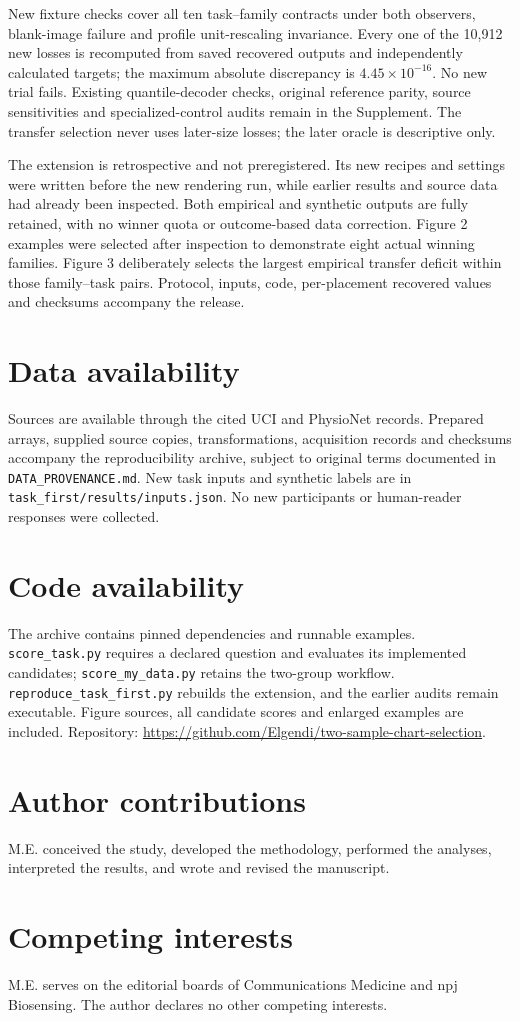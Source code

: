 \documentclass[11pt]{article}
\begin{document}
New fixture checks cover all ten task--family contracts under both observers, blank-image failure and profile unit-rescaling invariance. Every one of the 10,912 new losses is recomputed from saved recovered outputs and independently calculated targets; the maximum absolute discrepancy is $4.45\times10^{-16}$. No new trial fails. Existing quantile-decoder checks, original reference parity, source sensitivities and specialized-control audits remain in the Supplement. The transfer selection never uses later-size losses; the later oracle is descriptive only.

The extension is retrospective and not preregistered. Its new recipes and settings were written before the new rendering run, while earlier results and source data had already been inspected. Both empirical and synthetic outputs are fully retained, with no winner quota or outcome-based data correction. Figure 2 examples were selected after inspection to demonstrate eight actual winning families. Figure 3 deliberately selects the largest empirical transfer deficit within those family--task pairs. Protocol, inputs, code, per-placement recovered values and checksums accompany the release.

\section*{Data availability}
Sources are available through the cited UCI and PhysioNet records. Prepared arrays, supplied source copies, transformations, acquisition records and checksums accompany the reproducibility archive, subject to original terms documented in \texttt{DATA\_PROVENANCE.md}. New task inputs and synthetic labels are in \texttt{task\_first/results/inputs.json}. No new participants or human-reader responses were collected.

\section*{Code availability}
The archive contains pinned dependencies and runnable examples. \texttt{score\_task.py} requires a declared question and evaluates its implemented candidates; \texttt{score\_my\_data.py} retains the two-group workflow. \texttt{reproduce\_task\_first.py} rebuilds the extension, and the earlier audits remain executable. Figure sources, all candidate scores and enlarged examples are included. Repository: \url{https://github.com/Elgendi/two-sample-chart-selection}.

\section*{Author contributions}
M.E. conceived the study, developed the methodology, performed the analyses, interpreted the results, and wrote and revised the manuscript.
\section*{Competing interests}
M.E. serves on the editorial boards of Communications Medicine and npj Biosensing. The author declares no other competing interests.
\begingroup\scriptsize\setlength{\bibsep}{0pt}\endgroup
\end{document}
